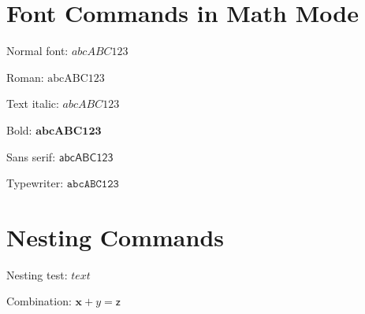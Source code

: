 \documentclass{article}
\begin{document}
\section*{Font Commands in Math Mode}

Normal font: $abcABC123$

Roman: $\mathrm{abcABC123}$

Text italic: $\mathit{abcABC123}$

Bold: $\mathbf{abcABC123}$

Sans serif: $\mathsf{abcABC123}$

Typewriter: $\mathtt{abcABC123}$

\section*{Nesting Commands}

Nesting test: $\mathbf{\mathit{text}}$

Combination: $\mathbf{x} + \mathit{y} = \mathsf{z}$
\end{document}
